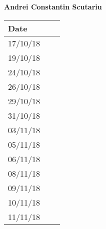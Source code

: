\documentclass[../main.tex]{subfiles}
\begin{document}
\begin{center}
	{\bf Andrei Constantin Scutariu}
	\vspace{2mm}
	
		\begin{tabular}{p{1.3cm}|p{1.8cm}|p{6.7cm}}
			\hline
			\bf Date & \bf \makebox[1.8cm][c]{Hours} & \bf \makebox[6.7cm][c]{Description} \\
			\hline
			17/10/18 & \makebox[1.8cm][c]{2h} & \makebox[6.7cm][c]{Introduction}\\
			19/10/18 & \makebox[1.8cm][c]{3h} & \makebox[6.7cm][c]{Goals, Requirements, Domain assumption}\\
			24/10/18 & \makebox[1.8cm][c]{4h} & \makebox[6.7cm][c]{Goals, Requirements, Domain assumption}\\
			26/10/18 & \makebox[1.8cm][c]{2h} & \makebox[6.7cm][c]{Purpose, Scope}\\
			29/10/18 & \makebox[1.8cm][c]{5h} & \makebox[6.7cm][c]{Use Cases, UML Class Diagram}\\
			31/10/18 & \makebox[1.8cm][c]{6h} & \makebox[6.7cm][c]{Use Cases, UML Class Diagram}\\
			03/11/18 & \makebox[1.8cm][c]{1h} & \makebox[6.7cm][c]{Mockups, Scenarios}\\
			05/11/18 & \makebox[1.8cm][c]{4h} & \makebox[6.7cm][c]{Scenarios, Sequence Diagram}\\
			06/11/18 & \makebox[1.8cm][c]{3h} & \makebox[6.7cm][c]{Mockups, Alloy}\\
			08/11/18 & \makebox[1.8cm][c]{3h} & \makebox[6.7cm][c]{Mockups, Sequence Diagramm, Alloy}\\
			09/11/18 & \makebox[1.8cm][c]{4h} & \makebox[6.7cm][c]{Alloy, Revisioning}\\
			10/11/18 & \makebox[1.8cm][c]{5h} & \makebox[6.7cm][c]{Alloy, Revisioning}\\
			11/11/18 & \makebox[1.8cm][c]{4h} & \makebox[6.7cm][c]{Revisioning}\\
		\end{tabular}
\end{center}
\vspace{1cm}
\end{document}
